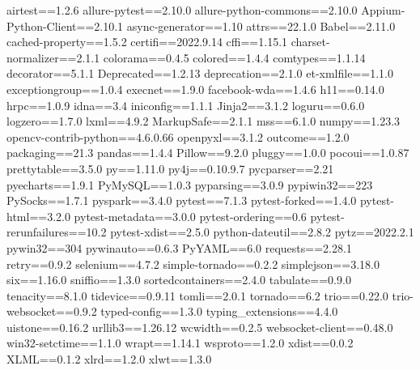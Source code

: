 airtest==1.2.6
allure-pytest==2.10.0
allure-python-commons==2.10.0
Appium-Python-Client==2.10.1
async-generator==1.10
attrs==22.1.0
Babel==2.11.0
cached-property==1.5.2
certifi==2022.9.14
cffi==1.15.1
charset-normalizer==2.1.1
colorama==0.4.5
colored==1.4.4
comtypes==1.1.14
decorator==5.1.1
Deprecated==1.2.13
deprecation==2.1.0
et-xmlfile==1.1.0
exceptiongroup==1.0.4
execnet==1.9.0
facebook-wda==1.4.6
h11==0.14.0
hrpc==1.0.9
idna==3.4
iniconfig==1.1.1
Jinja2==3.1.2
loguru==0.6.0
logzero==1.7.0
lxml==4.9.2
MarkupSafe==2.1.1
mss==6.1.0
numpy==1.23.3
opencv-contrib-python==4.6.0.66
openpyxl==3.1.2
outcome==1.2.0
packaging==21.3
pandas==1.4.4
Pillow==9.2.0
pluggy==1.0.0
pocoui==1.0.87
prettytable==3.5.0
py==1.11.0
py4j==0.10.9.7
pycparser==2.21
pyecharts==1.9.1
PyMySQL==1.0.3
pyparsing==3.0.9
pypiwin32==223
PySocks==1.7.1
pyspark==3.4.0
pytest==7.1.3
pytest-forked==1.4.0
pytest-html==3.2.0
pytest-metadata==3.0.0
pytest-ordering==0.6
pytest-rerunfailures==10.2
pytest-xdist==2.5.0
python-dateutil==2.8.2
pytz==2022.2.1
pywin32==304
pywinauto==0.6.3
PyYAML==6.0
requests==2.28.1
retry==0.9.2
selenium==4.7.2
simple-tornado==0.2.2
simplejson==3.18.0
six==1.16.0
sniffio==1.3.0
sortedcontainers==2.4.0
tabulate==0.9.0
tenacity==8.1.0
tidevice==0.9.11
tomli==2.0.1
tornado==6.2
trio==0.22.0
trio-websocket==0.9.2
typed-config==1.3.0
typing_extensions==4.4.0
uistone==0.16.2
urllib3==1.26.12
wcwidth==0.2.5
websocket-client==0.48.0
win32-setctime==1.1.0
wrapt==1.14.1
wsproto==1.2.0
xdist==0.0.2
XLML==0.1.2
xlrd==1.2.0
xlwt==1.3.0
